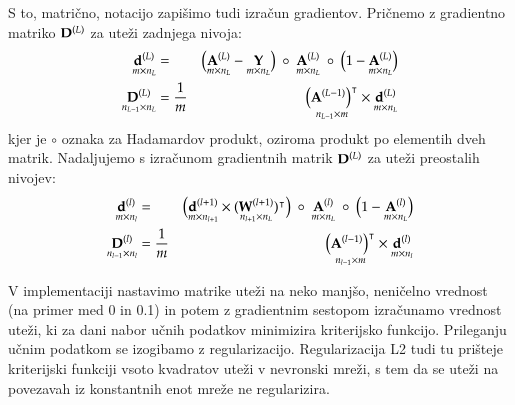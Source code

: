 S to, matrično, notacijo zapišimo tudi izračun gradientov. Pričnemo z gradientno matriko $\mathbf{D}^{(L)}$ za uteži zadnjega nivoja:
\begin{eqnarray}
  \underset{m\times n_L}{\matr{d}^{(L)}} & = & 
  \big(\underset{m\times n_L}{\matr{A}^{(L)}}-\underset{m\times n_L}{\matr{Y}}\big) 
  \ \circ\  \underset{m\times n_L}{\matr{A}^{(L)}} \ \circ \ \big(1-\underset{m\times n_L}{\matr{A}^{(L)}}\big) \\
%
  \underset{n_{L-1}\times n_L}{\matr{D}^{(L)}} & = {1\over m} & 
  \underset{n_{L-1}\times m}{\big(\matr{A}^{(L-1)}\big)^\tr} \times
  \underset{m\times n_L}{\matr{d}^{(L)}}
\end{eqnarray}
kjer je $\circ$ oznaka za Hadamardov produkt, oziroma produkt po elementih dveh matrik. Nadaljujemo s izračunom gradientnih matrik $\mathbf{D}^{(L)}$ za uteži preostalih nivojev:
\begin{eqnarray}
  \underset{m\times n_l}{\matr{d}^{(l)}} & = & 
  \big(\underset{m\times n_{l+1}} {\matr{d}^{(l+1)}}\times (\underset{n_{l+1}\times n_L}{\matr{W}^{(l+1)}})^\tr\big) 
  \ \circ\  \underset{m\times n_L}{\matr{A}^{(l)}} \ \circ \ \big(1-\underset{m\times n_L}{\matr{A}^{(l)}}\big) \\
%
  \underset{n_{l-1}\times n_l}{\matr{D}^{(l)}} & = {1\over m} & 
  \underset{n_{l-1}\times m}{\big(\matr{A}^{(l-1)}\big)^\tr} \times
  \underset{m\times n_l}{\matr{d}^{(l)}}
\end{eqnarray}

V implementaciji nastavimo matrike uteži na neko manjšo, neničelno vrednost (na primer med 0 in 0.1) in potem z gradientnim sestopom izračunamo vrednost uteži, ki za dani nabor učnih podatkov minimizira kriterijsko funkcijo. Prileganju učnim podatkom se izogibamo z regularizacijo. Regularizacija L2 tudi tu prišteje kriterijski funkciji vsoto kvadratov uteži v nevronski mreži, s tem da se uteži na povezavah iz konstantnih enot mreže ne regularizira.



